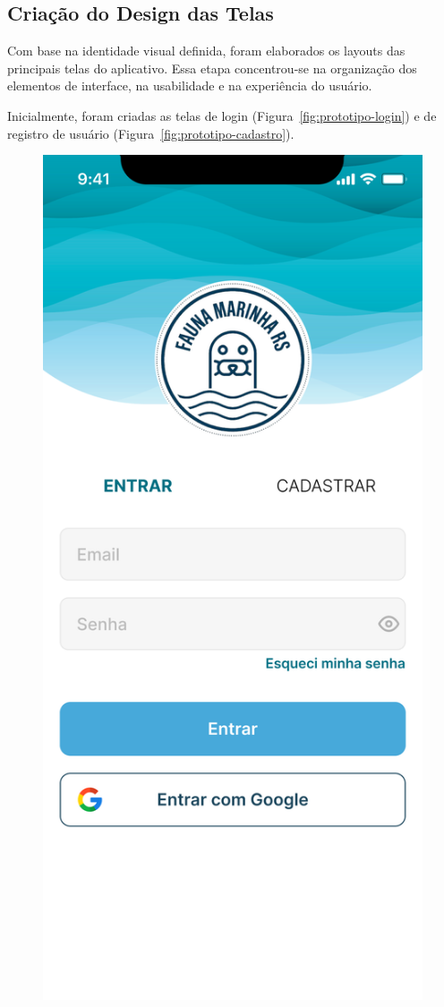 \subsection{Criação do Design das Telas}

Com base na identidade visual definida, foram elaborados os layouts das principais telas do 
aplicativo. Essa etapa concentrou-se na organização dos elementos de interface, na 
usabilidade e na experiência do usuário.

Inicialmente, foram criadas as telas de login (Figura~\ref{fig:prototipo-login}) e de 
registro de usuário (Figura~\ref{fig:prototipo-cadastro}).

\begin{figure}[H]
    \centering
    \begin{minipage}[b]{0.48\textwidth}
        \centering
        \includegraphics[height=0.6\textheight]{imagens/login-figma.png}

\end{minipage}
\end{figure}
